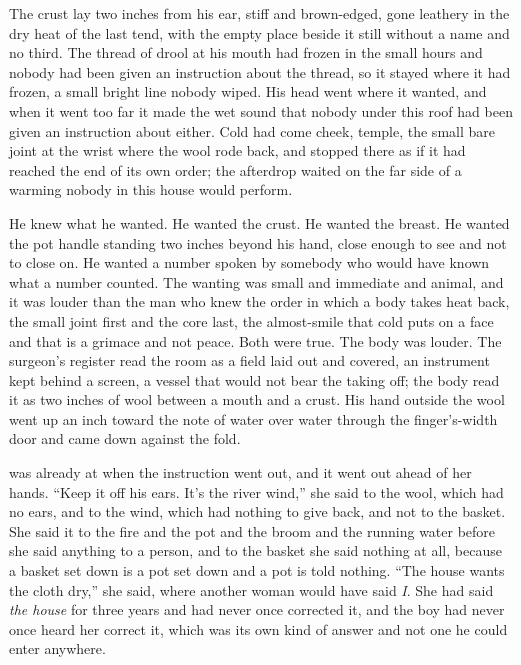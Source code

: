 The crust lay two inches from his ear, stiff and brown-edged, gone leathery in the dry heat of the last tend, with the empty place beside it still without a name and no third. The thread of drool at his mouth had frozen in the small hours and nobody had been given an instruction about the thread, so it stayed where it had frozen, a small bright line nobody wiped. His head went where it wanted, and when it went too far it made the wet sound that nobody under this roof had been given an instruction about either. Cold had come cheek, temple, the small bare joint at the wrist where the wool rode back, and stopped there as if it had reached the end of its own order; the afterdrop waited on the far side of a warming nobody in this house would perform.

He knew what he wanted. He wanted the crust. He wanted the breast. He wanted the pot handle standing two inches beyond his hand, close enough to see and not to close on. He wanted a number spoken by somebody who would have known what a number counted. The wanting was small and immediate and animal, and it was louder than the man who knew the order in which a body takes heat back, the small joint first and the core last, the almost-smile that cold puts on a face and that is a grimace and not peace. Both were true. The body was louder. The surgeon's register read the room as a field laid out and covered, an instrument kept behind a screen, a vessel that would not bear the taking off; the body read it as two inches of wool between a mouth and a crust. His hand outside the wool went up an inch toward the note of water over water through the finger's-width door and came down against the fold.

 was already at  when the instruction went out, and it went out ahead of her hands. “Keep it off his ears. It's the river wind,” she said to the wool, which had no ears, and to the wind, which had nothing to give back, and not to the basket. She said it to the fire and the pot and the broom and the running water before she said anything to a person, and to the basket she said nothing at all, because a basket set down is a pot set down and a pot is told nothing. “The house wants the cloth dry,” she said, where another woman would have said \emph{I}. She had said \emph{the house} for three years and had never once corrected it, and the boy had never once heard her correct it, which was its own kind of answer and not one he could enter anywhere.

